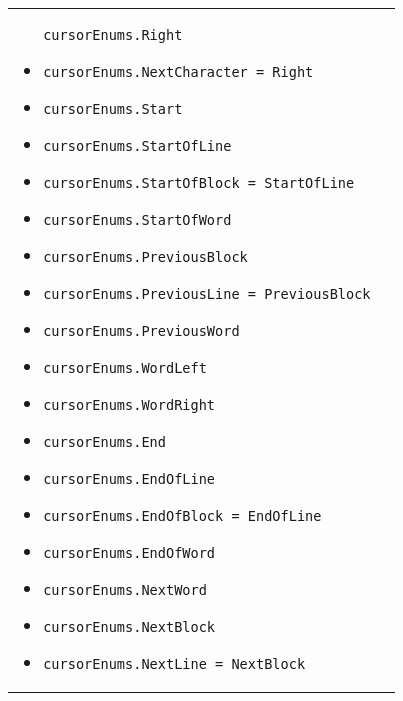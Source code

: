 \begin{longtable}{XX}
\begin{itemize}
      \texttt{cursorEnums.Right}
    \item
      \texttt{cursorEnums.NextCharacter = Right}
    \item
      \texttt{cursorEnums.Start}
    \item
      \texttt{cursorEnums.StartOfLine}
    \item
      \texttt{cursorEnums.StartOfBlock = StartOfLine}
    \item
      \texttt{cursorEnums.StartOfWord}
    \item
      \texttt{cursorEnums.PreviousBlock}
    \item
      \texttt{cursorEnums.PreviousLine = PreviousBlock}
    \item
      \texttt{cursorEnums.PreviousWord}
    \item
      \texttt{cursorEnums.WordLeft}
    \item
      \texttt{cursorEnums.WordRight}
    \item
      \texttt{cursorEnums.End}
    \item
      \texttt{cursorEnums.EndOfLine}
    \item
      \texttt{cursorEnums.EndOfBlock = EndOfLine}
    \item
      \texttt{cursorEnums.EndOfWord}
    \item
      \texttt{cursorEnums.NextWord}
    \item
      \texttt{cursorEnums.NextBlock}
    \item
      \texttt{cursorEnums.NextLine = NextBlock}
    \end{itemize}


\end{longtable}
